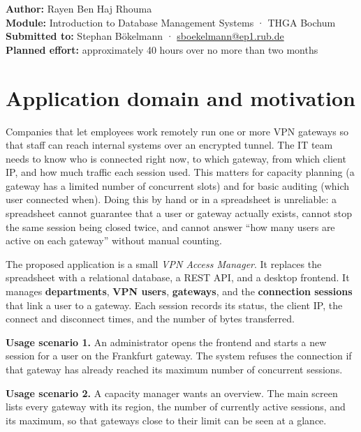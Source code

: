 \documentclass[11pt,a4paper]{article}
\newcommand{\authorName}{Rayen Ben Haj Rhouma}
\newcommand{\projectTitle}{VPN Access Manager}
\begin{document}
\thispagestyle{empty}
\thgaTitel{Term Project – Proposal}{\projectTitle}

\begin{infobox}
\textbf{Author:} \authorName \\
\textbf{Module:} Introduction to Database Management Systems · THGA Bochum \\
\textbf{Submitted to:} Stephan Bökelmann · \href{mailto:sboekelmann@ep1.rub.de}{sboekelmann@ep1.rub.de} \\
\textbf{Planned effort:} approximately 40 hours over no more than two months
\end{infobox}

\section{Application domain and motivation}

Companies that let employees work remotely run one or more VPN gateways so that
staff can reach internal systems over an encrypted tunnel. The IT team needs to
know who is connected right now, to which gateway, from which client IP, and how
much traffic each session used. This matters for capacity planning (a gateway
has a limited number of concurrent slots) and for basic auditing (which user
connected when). Doing this by hand or in a spreadsheet is unreliable: a
spreadsheet cannot guarantee that a user or gateway actually exists, cannot stop
the same session being closed twice, and cannot answer ``how many users are
active on each gateway'' without manual counting.

The proposed application is a small \emph{VPN Access Manager}. It replaces the
spreadsheet with a relational database, a REST API, and a desktop frontend. It
manages \textbf{departments}, \textbf{VPN users}, \textbf{gateways}, and the
\textbf{connection sessions} that link a user to a gateway. Each session records
its status, the client IP, the connect and disconnect times, and the number of
bytes transferred.

\textbf{Usage scenario 1.} An administrator opens the frontend and starts a new
session for a user on the Frankfurt gateway. The system refuses the connection
if that gateway has already reached its maximum number of concurrent sessions.

\textbf{Usage scenario 2.} A capacity manager wants an overview. The main screen
lists every gateway with its region, the number of currently active sessions,
and its maximum, so that gateways close to their limit can be seen at a glance.
\end{document}
